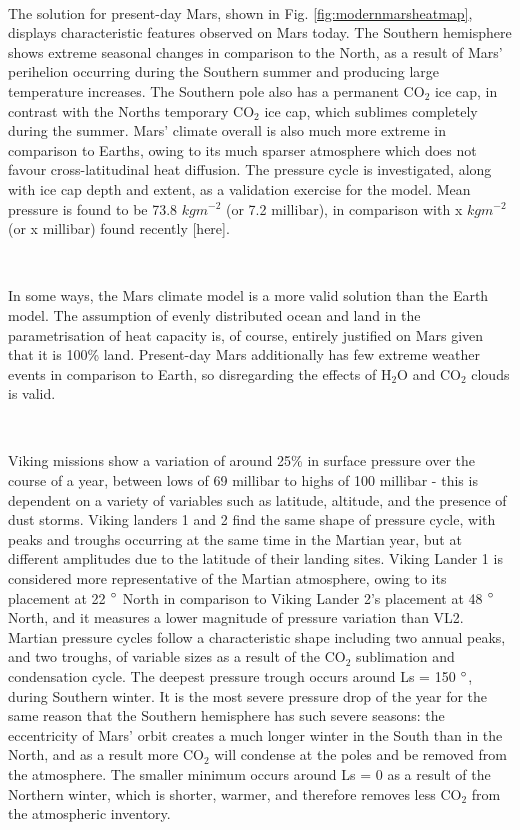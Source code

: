 \documentclass[12pt,onecolumn]{revtex4-2}    %
\begin{document}
\

The solution for present-day Mars, shown in Fig. \ref{fig:modernmarsheatmap}, displays characteristic features observed on Mars today. The Southern hemisphere shows extreme seasonal changes in comparison to the North, as a result of Mars' perihelion occurring during the Southern summer and producing large temperature increases. The Southern pole also has a permanent $\mathrm{CO_2}$ ice cap, in contrast with the Norths temporary $\mathrm{CO_2}$ ice cap, which sublimes completely during the summer. Mars' climate overall is also much more extreme in comparison to Earths, owing to its much sparser atmosphere which does not favour cross-latitudinal heat diffusion. The pressure cycle is investigated, along with ice cap depth and extent, as a validation exercise for the model. Mean pressure is found to be 73.8 $kgm^{-2}$ (or 7.2 millibar), in comparison with x $kgm^{-2}$ (or x millibar) found recently [here].

\

In some ways, the Mars climate model is a more valid solution than the Earth model. The assumption of evenly distributed ocean and land in the parametrisation of heat capacity is, of course, entirely justified on Mars given that it is 100\% land. Present-day Mars additionally has few extreme weather events in comparison to Earth, so disregarding the effects of $\mathrm{H_2 O}$ and $\mathrm{CO_2}$ clouds is valid.

\ 

Viking missions show a variation of around 25\% in surface pressure over the course of a year, between lows of 69 millibar to highs of 100 millibar - this is dependent on a variety of variables such as latitude, altitude, and the presence of dust storms. Viking landers 1 and 2 find the same shape of pressure cycle, with peaks and troughs occurring at the same time in the Martian year, but at different amplitudes due to the latitude of their landing sites. Viking Lander 1 is considered more representative of the Martian atmosphere, owing to its placement at 22 $\degree$ North in comparison to Viking Lander 2's placement at 48 $\degree$ North, and it measures a lower magnitude of pressure variation than VL2. Martian pressure cycles follow a characteristic shape including two annual peaks, and two troughs, of variable sizes as a result of the $\mathrm{CO_2}$ sublimation and condensation cycle. The deepest pressure trough occurs around Ls = 150 $\degree$, during Southern winter. It is the most severe pressure drop of the year for the same reason that the Southern hemisphere has such severe seasons: the eccentricity of Mars' orbit creates a much longer winter in the South than in the North, and as a result more $\mathrm{CO_2}$ will condense at the poles and be removed from the atmosphere. The smaller minimum occurs around Ls = 0 as a result of the Northern winter, which is shorter, warmer, and therefore removes less $\mathrm{CO_2}$ from the atmospheric inventory.
\end{document}
